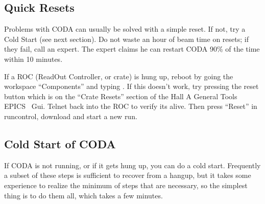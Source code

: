 {\begin{itemize}
\end{itemize}

\subsection{ Quick Resets }

Problems with CODA can usually be solved with a simple
reset.  If not, try a Cold Start (see next section).
Do not waste an hour of beam time on resets; 
if they fail, call an expert.  
The expert claims he can restart CODA 
90\% of the time within 10 minutes.

If a ROC (ReadOut Controller, or crate)
is hung up, reboot by going the workspace
``Components'' and typing .  If this 
doesn't work, try pressing the reset button 
which is on the ``Crate Resets'' section of the
Hall A General Tools EPICS~\cite{EPICSwww} Gui.  Telnet back into
the ROC to verify its alive.  Then press ``Reset''
in runcontrol, download and start a new run.

\subsection{ Cold Start of CODA}

\par
If CODA is not running, or if it gets hung up,
you can do a cold start.  Frequently a subset of
these steps is sufficient to recover from a hangup,
but it takes some experience to realize the
minimum of steps that
are necessary, so the simplest 
thing is to do them all, which takes a few minutes.

}
